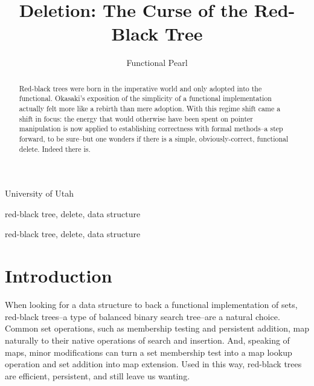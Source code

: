 \documentclass[preprint]{sigplanconf}
\begin{document}
\copyrightdata{[to be supplied]} 


\title{Deletion: The Curse of the Red-Black Tree}
\subtitle{Functional Pearl}

           {University of Utah}

\maketitle

\begin{abstract}
Red-black trees were born in the imperative world and only adopted into the functional. Okasaki's exposition of the simplicity of a functional implementation actually felt more like a rebirth than mere adoption. With this regime shift came a shift in focus: the energy that would otherwise have been spent on pointer manipulation is now applied to establishing correctness with formal methods--a step forward, to be sure--but one wonders if there is a simple, obviously-correct, functional delete. Indeed there is.
\end{abstract}


\terms
red-black tree, delete, data structure

\keywords
red-black tree, delete, data structure

\section{Introduction}

When looking for a data structure to back a functional implementation of sets, red-black trees--a type of balanced binary search tree--are a natural choice. Common set operations, such as membership testing and persistent addition, map naturally to their native operations of search and insertion. And, speaking of maps, minor modifications can turn a set membership test into a map lookup operation and set addition into map extension. Used in this way, red-black trees are efficient, persistent, and still leave us wanting.
\end{document}
